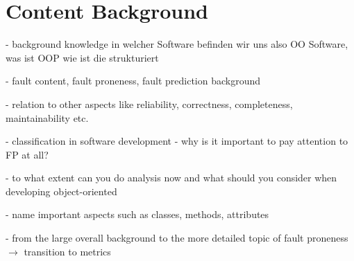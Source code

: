 \section{Content Background}\label{content}

- background knowledge in welcher Software befinden wir uns also OO Software, was ist OOP wie ist die strukturiert

- fault content, fault proneness, fault prediction background

- relation to other aspects like reliability, correctness, completeness, maintainability etc.

- classification in software development - why is it important to pay attention to FP at all?

- to what extent can you do analysis now and what should you consider when developing object-oriented

- name important aspects such as classes, methods, attributes

- from the large overall background to the more detailed topic of fault proneness $\rightarrow$ transition to metrics